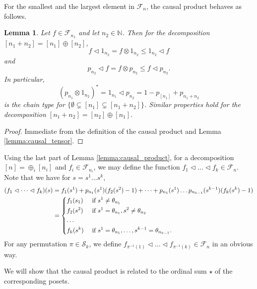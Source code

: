 \documentclass[12pt]{article}
\newtheorem{lemma}{Lemma}
\theoremstyle{definition}
\theoremstyle{remark}
\def\Fe{\mathcal F}
\def\permut{\mathscr{S}}
\def\vtl{\vartriangleleft}
\begin{document}
For the smallest and the largest element in $\Fe_n$, the causal product behaves as
follows.
\begin{lemma}\label{lemma:onechain_causal}
Let  $f\in \Fe_{n_1}$ and let $n_2\in \mathbb N$. Then for the decomposition
$[n_1+n_2]=[n_1]\oplus [n_2]$,  
\[
f\vtl 1_{n_2}= f\otimes 1_{n_2}\le 1_{n_2}\vtl f
\]
and
\[
p_{n_2} \vtl f= f \otimes p_{n_2}\le f\vtl p_{n_2}.
\]
In particular,
\[
(p_{n_1}\otimes 1_{n_2})^*=1_{n_1}\vtl p_{n_2}=1-p_{[n_1]}+p_{n_1+n_2}
\]
is the chain type for $\{\emptyset\subsetneq [n_1]\subsetneq [n_1+n_2]\}$. Similar
properties hold for the decomposition $[n_1+n_2]=[n_2]\oplus[n_1]$.
\end{lemma}

\begin{proof}
Immediate from the definition of the causal product and Lemma \ref{lemma:causal_tensor}.

\end{proof}







Using the last part of Lemma \ref{lemma:causal_product},
for a decomposition $[n]=\oplus_i[n_i]$ and $f_i\in \Fe_{n_i}$,  we may define the function $f_1\vtl\dots \vtl f_k\in
\Fe_{n}$. Note that we have for $s=s^1\dots s^k$, 
\begin{align*}
(f_1\vtl \dots\vtl f_k)(s)&=f_1(s^1)+p_{n_1}(s^1)(f_2(s^2)-1)+\dots + p_{n_1}(s^1)\dots
p_{n_{k-1}}(s^{k-1})(f_k(s^k)-1)\\
&= \begin{dcases} f_1(s_1) & \text{ if } s^1\ne \theta_{n_1}\\
f_2(s^2) & \text{ if } s^1=\theta_{n_1}, s^2\ne \theta_{n_2}\\
\dots & \\
f_k(s^k) & \text{ if } s^1=\theta_{n_1},\dots,  s^{k-1}=\theta_{n_{k-1}}.
\end{dcases}
\end{align*}
For any permutation $\pi\in \permut_k$, we define  $f_{\pi^{-1}(1)}\vtl \dots \vtl
f_{\pi^{-1}(k)}\in \Fe_n$ in an obvious way.


We will show that the causal product is related to the ordinal sum $\star$ of the corresponding
posets.
\end{document}
